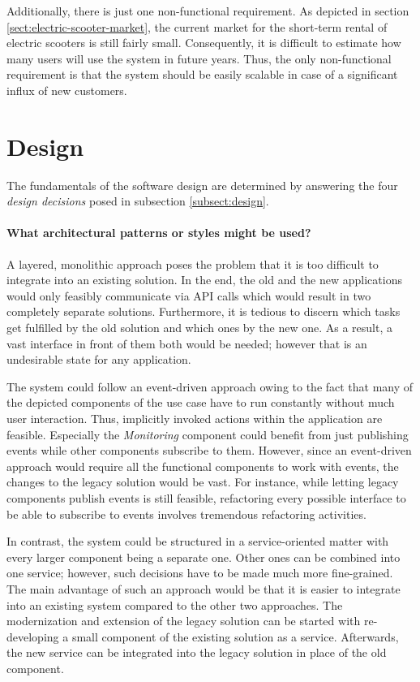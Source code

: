 \documentclass[12pt,a4paper,twoside]{report}
\begin{document}
Additionally, there is just one non-functional requirement.
As depicted in section \ref{sect:electric-scooter-market}, the current market
for the short-term rental of electric scooters is still fairly small.
Consequently, it is difficult to estimate how many users will use the system
in future years. Thus, the only non-functional requirement is that the system
should be easily scalable in case of a significant influx of new customers.


\section{Design}

The fundamentals of the software design are determined by answering the four
\textit{design decisions} posed in subsection \ref{subsect:design}.

\paragraph{What architectural patterns or styles might be used?}
A layered, monolithic approach poses the problem that it is too difficult
to integrate into an existing solution. In the end, the old and the new
applications would only feasibly communicate via API calls which would result
in two completely separate solutions. Furthermore, it is tedious to discern
which tasks get fulfilled by the old solution and which ones by the new one.
As a result, a vast interface in front of them both would be needed;
however that is an undesirable state for any application.

The system could follow an event-driven approach owing to the fact that
many of the depicted components of the use case have to run constantly without
much user interaction. Thus, implicitly invoked actions within the application
are feasible. Especially the \textit{Monitoring} component could benefit from
just publishing events while other components subscribe to them.
However, since an event-driven approach would require all the
functional components to work with events, the changes to the legacy solution
would be vast. For instance, while letting legacy components publish events
is still feasible, refactoring every possible interface to be able
to subscribe to events involves tremendous refactoring activities.

In contrast, the system could be structured in a service-oriented matter with
every larger component being a separate one. Other ones can be combined into
one service; however, such decisions have to be made much more fine-grained.
The main advantage of such an approach would be that it is easier to
integrate into an existing system compared to the other two approaches.
The modernization and extension of the legacy solution can be started with
re-developing a small component of the existing solution as a service.
Afterwards, the new service can be integrated into the legacy solution
in place of the old component.
\end{document}
